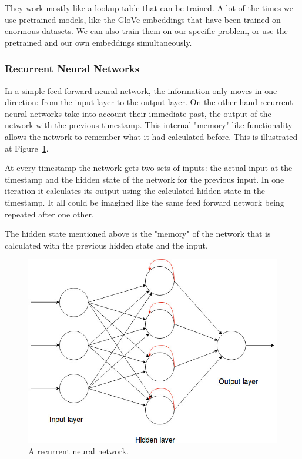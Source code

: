 They work mostly like a lookup table that can be trained. A lot of the times we use pretrained models, like the GloVe embeddings that have been trained on enormous datasets. We can also train them on our specific problem, or use the pretrained and our own embeddings simultaneously.
\FloatBarrier

\subsubsection{Recurrent Neural Networks}

In a simple feed forward neural network, the information only moves in one direction: from the input layer to the output layer. On the other hand recurrent neural networks take into account their immediate past, the output of the network with the previous timestamp. This internal "memory" like functionality allows the network to remember what it had calculated before. This is illustrated at Figure~\ref{fig:recurrent_net}.

At every timestamp the network gets two sets of inputs: the actual input at the timestamp and the hidden state of the network for the previous input. In one iteration it calculates its output using the calculated hidden state in the timestamp. It all could be imagined like the same feed forward network being repeated after one other.

The hidden state mentioned above is the "memory" of the network that is calculated with the previous hidden state and the input.

\begin{figure}[!htb]
	\centering
	\includegraphics[scale=0.5]{figures/recurrent_neural_network.jpg}
	\caption{A recurrent neural network.}
	\label{fig:recurrent_net}
\end{figure}

